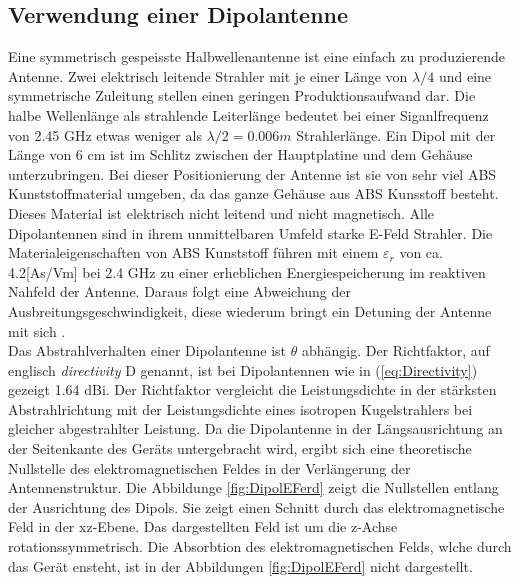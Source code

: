 \subsection{Verwendung einer Dipolantenne}
Eine symmetrisch gespeisste Halbwellenantenne ist eine einfach zu produzierende Antenne. Zwei elektrisch leitende Strahler mit je einer Länge von $\lambda/4$ und eine symmetrische Zuleitung stellen einen geringen Produktionsaufwand dar. Die halbe Wellenlänge als strahlende Leiterlänge bedeutet bei einer Siganlfrequenz von 2.45 GHz etwas weniger als $\lambda/2=0.006m$ Strahlerlänge. Ein Dipol mit der Länge von 6 cm ist im Schlitz zwischen der Hauptplatine und dem Gehäuse unterzubringen. 
Bei dieser Positionierung der Antenne ist sie von sehr viel ABS Kunststoffmaterial umgeben, da das ganze Gehäuse aus ABS Kunsstoff besteht. Dieses Material ist elektrisch nicht leitend und nicht magnetisch. Alle Dipolantennen sind in ihrem unmittelbaren Umfeld starke E-Feld Strahler. Die Materialeigenschaften von ABS Kunststoff führen mit einem $\varepsilon_r$ von ca. 4.2[As/Vm] bei 2.4 GHz zu einer erheblichen Energiespeicherung im reaktiven Nahfeld der Antenne. Daraus folgt eine Abweichung der Ausbreitungsgeschwindigkeit, diese wiederum bringt ein Detuning der Antenne mit sich \cite{WikiPermitt}.\\

Das Abstrahlverhalten einer Dipolantenne ist $\theta$ abhängig. Der Richtfaktor, auf englisch \textit{directivity} D genannt, ist bei Dipolantennen wie in (\ref{eq:Directivity}) gezeigt 1.64 dBi. Der Richtfaktor vergleicht die Leistungsdichte in der stärksten Abstrahlrichtung mit der Leistungsdichte eines isotropen Kugelstrahlers bei gleicher abgestrahlter Leistung. Da die Dipolantenne in der Längsausrichtung an der Seitenkante des Geräts untergebracht wird, ergibt sich eine theoretische Nullstelle des elektromagnetischen Feldes in der Verlängerung der Antennenstruktur. Die Abbildunge \ref{fig:DipolEFerd} zeigt die Nullstellen entlang der Ausrichtung des Dipols. Sie zeigt einen Schnitt durch das elektromagnetische Feld in der xz-Ebene. Das dargestellten Feld ist um die z-Achse rotationssymmetrisch. Die Absorbtion des elektromagnetischen Felds, wlche durch das Gerät ensteht, ist in der Abbildungen \ref{fig:DipolEFerd} nicht dargestellt.

